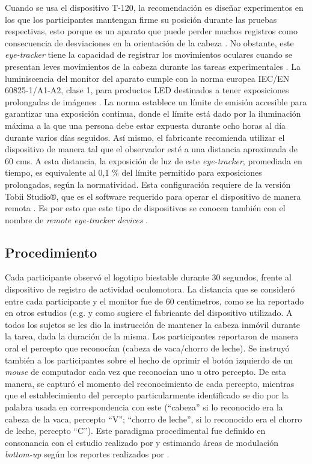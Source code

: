 \documentclass[spanish]{textolivre}
\begin{document}
Cuando se usa el dispositivo T-120, la recomendación es diseñar experimentos en los que los participantes mantengan firme su posición durante las pruebas respectivas, esto porque es un aparato que puede perder muchos registros como consecuencia de desviaciones en la orientación de la cabeza \cite{hessels_qualitative_2015}. No obstante, este \textit{eye-tracker} tiene la capacidad de registrar los movimientos oculares cuando se presentan leves movimientos de la cabeza durante las tareas experimentales \cite{leckey_response_2020}. La luminiscencia del monitor del aparato cumple con la norma europea IEC/EN 60825-1/A1-A2, clase 1, para productos LED destinados a tener exposiciones prolongadas de imágenes \cite{tobii_ab_user_2012}. La norma establece un límite de emisión accesible para garantizar una exposición continua, donde el límite está dado por la iluminación máxima a la que una persona debe estar expuesta durante ocho horas al día durante varios días seguidos. Así mismo, el fabricante recomienda utilizar el dispositivo de manera tal que el observador esté a una distancia aproximada de 60 cms. A esta distancia, la exposición de luz de este \textit{eye-tracker}, promediada en tiempo, es equivalente al 0,1 \% del límite permitido para exposiciones prolongadas, según la normatividad. Esta configuración requiere de la versión Tobii Studio®, que es el software requerido para operar el dispositivo de manera remota \cite{arfe_effects_2023}. Es por esto que este tipo de dispositivos se conocen también con el nombre de \textit{remote eye-tracker devices} \cite{hessels_qualitative_2015}.


\subsection{Procedimiento}\label{sec-formato}
Cada participante observó el logotipo biestable durante 30 segundos, frente al dispositivo de registro de actividad oculomotora. La distancia que se consideró entre cada participante y el monitor fue de 60 centímetros, como se ha reportado en otros estudios (e.g. \textcite{marroquin-ciendua_modulacion_2020,rodriguez-martinez_biestabilidad_2022} y como sugiere el fabricante del dispositivo utilizado. A todos los sujetos se les dio la instrucción de mantener la cabeza inmóvil durante la tarea, dada la duración de la misma. Los participantes reportaron de manera oral el percepto que reconocían (cabeza de vaca/chorro de leche). Se instruyó también a los participantes sobre el hecho de oprimir el botón izquierdo de un \textit{mouse} de computador cada vez que reconocían uno u otro percepto. De esta manera, se capturó el momento del reconocimiento de cada percepto, mientras que el establecimiento del percepto particularmente identificado se dio por la palabra usada en correspondencia con este (“cabeza” si lo reconocido era la cabeza de la vaca, percepto “V”; “chorro de leche”, si lo reconocido era el chorro de leche, percepto “C”). Este paradigma procedimental fue definido en consonancia con el estudio realizado por \textcite{rodriguez-martinez_ocular_2021} y estimando áreas de modulación \textit{bottom-up} según los reportes realizados por \textcite{rodriguez-martinez_can_2024}.
\end{document}
